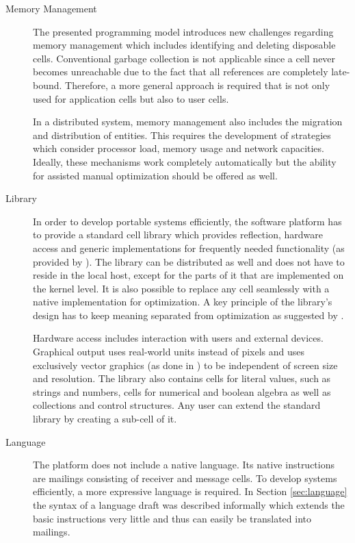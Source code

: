 \begin{description}
\item[Memory Management]

The presented programming model introduces new challenges regarding memory management which includes identifying and deleting disposable cells. Conventional garbage collection is not applicable since a cell never becomes unreachable due to the fact that all references are completely late-bound. Therefore, a more general approach is required that is not only used for application cells but also to user cells.

In a distributed system, memory management also includes the migration and distribution of entities. This requires the development of strategies which consider processor load, memory usage and network capacities. Ideally, these mechanisms work completely automatically but the ability for assisted manual optimization should be offered as well.

\item[Library]

In order to develop portable systems efficiently, the software platform has to provide a standard cell library which provides reflection, hardware access and generic implementations for frequently needed functionality (as provided by \cite{GnuSmalltalk}). The library can be distributed as well and does not have to reside in the local host, except for the parts of it that are implemented on the kernel level. It is also possible to replace any cell seamlessly with a native implementation for optimization. A key principle of the library's design has to keep meaning separated from optimization as suggested by \cite{Steps2008}.

Hardware access includes interaction with users and external devices. Graphical output uses real-world units instead of pixels and uses exclusively vector graphics (as done in \cite{Steps2007}) to be independent of screen size and resolution. The library also contains cells for literal values, such as strings and numbers, cells for numerical and boolean algebra as well as collections and control structures. Any user can extend the standard library by creating a sub-cell of it.

\item[Language]

The platform does not include a native language. Its native instructions are mailings consisting of receiver and message cells. To develop systems efficiently, a more expressive language is required. In Section \ref{sec:language} the syntax of a language draft was described informally which extends the basic instructions very little and thus can easily be translated into mailings.


\end{description}
